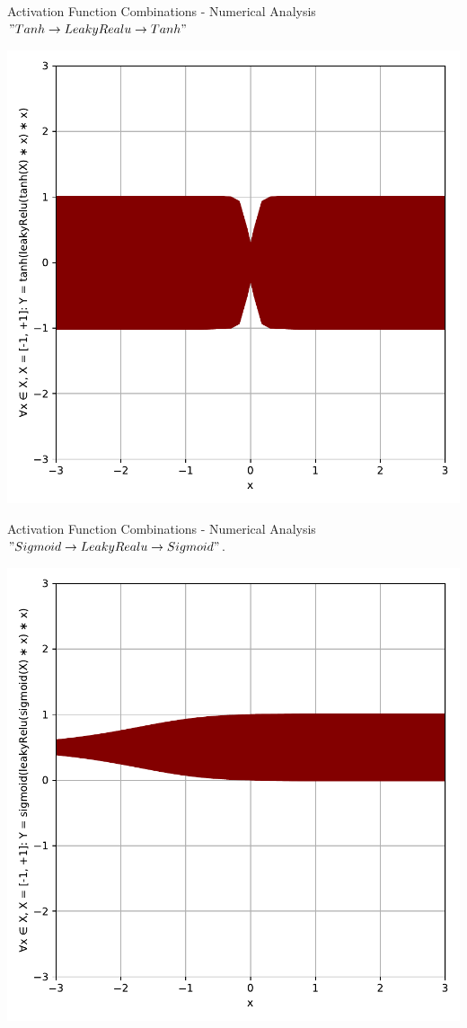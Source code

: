 \documentclass{beamer}
\begin{document}
		\begin{frame}{Activation Function Combinations - Numerical Analysis}
			$" Tanh \rightarrow LeakyRealu \rightarrow Tanh "$
			\begin{center}
				\includegraphics[height=0.9\textheight]{tanh_leakyRelu_tanh}
			\end{center}
		\end{frame}
		\begin{frame}{Activation Function Combinations - Numerical Analysis}
			$" Sigmoid \rightarrow LeakyRealu \rightarrow Sigmoid "$.
			\begin{center}
				\includegraphics[height=0.9\textheight]{sigmoid_leakyRelu_sigmoid}
			\end{center}
		\end{frame}
\end{document}
